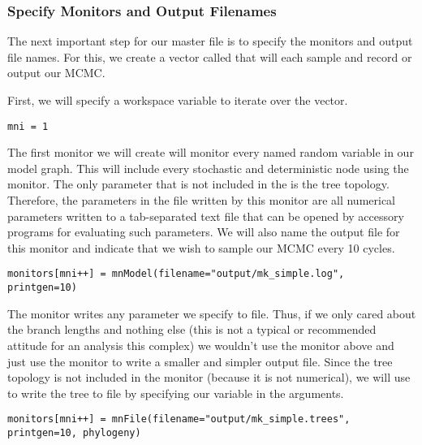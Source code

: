 \medskip
\subsubsection{Specify Monitors and Output Filenames}\label{subsub:Exercise-Monitors}

The next important step for our master \Rev file is to specify the monitors and output file names.
For this, we create a vector called  that will each sample and record or output our MCMC. 

First, we will specify a workspace variable to iterate over the  vector.
{\tt \begin{snugshade*}
\begin{lstlisting}
mni = 1
\end{lstlisting}
\end{snugshade*}}

The first monitor we will create will monitor every named random variable in our model graph. 
This will include every stochastic and deterministic node using the  monitor.
The only parameter that is not included in the  is the tree topology. 
Therefore, the parameters in the file written by this monitor are all numerical parameters written to a tab-separated text file that can be opened by accessory programs for evaluating such parameters.
We will also name the output file for this monitor and indicate that we wish to sample our MCMC every 10 cycles.
{\tt \begin{snugshade*}
\begin{lstlisting}
monitors[mni++] = mnModel(filename="output/mk_simple.log", printgen=10)
\end{lstlisting}
\end{snugshade*}}

The  monitor writes any parameter we specify to file.
Thus, if we only cared about the branch lengths and nothing else (this is not a typical or recommended attitude for an analysis this complex) we wouldn't use the  monitor above and just use the  monitor to write a smaller and simpler output file.
Since the tree topology is not included in the  monitor (because it is not numerical), we will use  to write the tree to file by specifying our  variable in the arguments.
{\tt \begin{snugshade*}
\begin{lstlisting}
monitors[mni++] = mnFile(filename="output/mk_simple.trees", printgen=10, phylogeny)
\end{lstlisting}
\end{snugshade*}}

